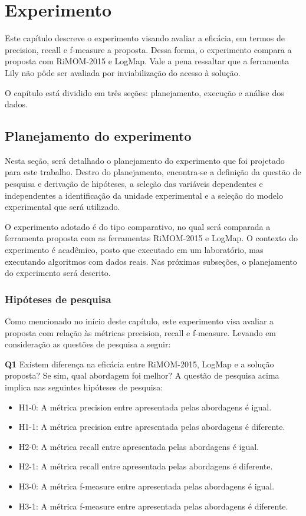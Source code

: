\chapter{Experimento}
Este capítulo descreve o experimento visando avaliar a eficácia, em termos de precision, recall e f-measure \cite{goutte2005probabilistic} a proposta. Dessa forma,  o experimento compara a proposta com RiMOM-2015 e LogMap. Vale a pena ressaltar que a ferramenta Lily não pôde ser avaliada por inviabilização do acesso à solução.

O capítulo está dividido em três seções: planejamento, execução e análise dos dados. 

\section*{Planejamento do experimento}

Nesta seção, será detalhado o planejamento do experimento que foi projetado para este trabalho. Destro do planejamento, encontra-se a definição da questão de pesquisa e derivação de hipóteses, a seleção das variáveis dependentes e independentes a identificação da unidade experimental e a seleção do modelo experimental que será utilizado.

O experimento adotado é do tipo comparativo, no qual será comparada a ferramenta proposta com as ferramentas RiMOM-2015 e LogMap. O contexto do experimento é acadêmico, posto que executado em um laboratório, mas executando algoritmos com dados reais. Nas próximas subseções, o planejamento do experimento será descrito.

\subsection*{Hipóteses de pesquisa}

Como mencionado no início deste capítulo, este experimento visa avaliar a proposta com relação às métricas precision, recall e f-measure. Levando em consideração as questões de pesquisa a seguir:

\textbf{Q1} Existem diferença na eficácia entre RiMOM-2015, LogMap e a solução proposta? Se sim, qual abordagem foi melhor?
A questão de pesquisa acima implica nas seguintes hipóteses de pesquisa:

\begin{itemize}
\item H1-0: A métrica precision entre apresentada pelas abordagens é igual.
\item H1-1: A métrica precision entre apresentada pelas abordagens é diferente.
\item H2-0: A métrica recall entre apresentada pelas abordagens é igual.
\item H2-1: A métrica recall entre apresentada pelas abordagens é diferente.
\item H3-0: A métrica f-measure entre apresentada pelas abordagens é igual.
\item H3-1: A métrica f-measure entre apresentada pelas abordagens é diferente.
\end{itemize}

